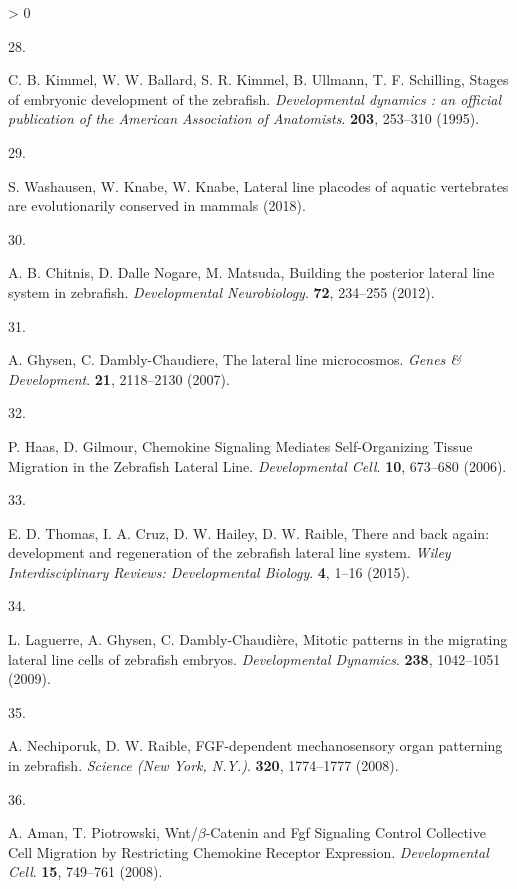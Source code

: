 \documentclass[10pt, b5paper, singlespacinge, twoside]{reedthesis} %
\newlength{\cslhangindent}
\newlength{\csllabelwidth}
\newenvironment{CSLReferences}[3] %
  {%
    \setlength{\parindent}{0pt}
    \ifodd #1 \everypar{\setlength{\hangindent}{\cslhangindent}}\ignorespaces\fi
    \ifnum #2 > 0
    \setlength{\parskip}{#2\baselineskip}
    \fi
  }%
  {}
\newcommand{\CSLLeftMargin}[1]{\parbox[t]{\maxof{\widthof{#1}}{\csllabelwidth}}{#1}}
\newcommand{\CSLRightInline}[1]{\parbox[t]{\linewidth}{#1}}
\theoremstyle{definition}
\theoremstyle{definition}
\theoremstyle{definition}
\theoremstyle{remark}
\begin{document}
\begin{CSLReferences}{0}{0}
\leavevmode\hypertarget{ref-Kimmel1995a}{}%
\CSLLeftMargin{28. }
\CSLRightInline{C. B. Kimmel, W. W. Ballard, S. R. Kimmel, B. Ullmann, T. F. Schilling, {Stages of embryonic development of the zebrafish.} \emph{Developmental dynamics : an official publication of the American Association of Anatomists}. \textbf{203}, 253--310 (1995).}

\leavevmode\hypertarget{ref-Washausen2018}{}%
\CSLLeftMargin{29. }
\CSLRightInline{S. Washausen, W. Knabe, W. Knabe, {Lateral line placodes of aquatic vertebrates are evolutionarily conserved in mammals} (2018).}

\leavevmode\hypertarget{ref-Chitnis2012a}{}%
\CSLLeftMargin{30. }
\CSLRightInline{A. B. Chitnis, D. Dalle Nogare, M. Matsuda, {Building the posterior lateral line system in zebrafish}. \emph{Developmental Neurobiology}. \textbf{72}, 234--255 (2012).}

\leavevmode\hypertarget{ref-Ghysen2007a}{}%
\CSLLeftMargin{31. }
\CSLRightInline{A. Ghysen, C. Dambly-Chaudiere, {The lateral line microcosmos}. \emph{Genes {\&} Development}. \textbf{21}, 2118--2130 (2007).}

\leavevmode\hypertarget{ref-Haas2006c}{}%
\CSLLeftMargin{32. }
\CSLRightInline{P. Haas, D. Gilmour, {Chemokine Signaling Mediates Self-Organizing Tissue Migration in the Zebrafish Lateral Line}. \emph{Developmental Cell}. \textbf{10}, 673--680 (2006).}

\leavevmode\hypertarget{ref-Harding2014a}{}%
\CSLLeftMargin{33. }
\CSLRightInline{E. D. Thomas, I. A. Cruz, D. W. Hailey, D. W. Raible, {There and back again: development and regeneration of the zebrafish lateral line system}. \emph{Wiley Interdisciplinary Reviews: Developmental Biology}. \textbf{4}, 1--16 (2015).}

\leavevmode\hypertarget{ref-Laguerre2009a}{}%
\CSLLeftMargin{34. }
\CSLRightInline{L. Laguerre, A. Ghysen, C. Dambly-Chaudière, {Mitotic patterns in the migrating lateral line cells of zebrafish embryos}. \emph{Developmental Dynamics}. \textbf{238}, 1042--1051 (2009).}

\leavevmode\hypertarget{ref-Nechiporuk2008}{}%
\CSLLeftMargin{35. }
\CSLRightInline{A. Nechiporuk, D. W. Raible, {FGF-dependent mechanosensory organ patterning in zebrafish.} \emph{Science (New York, N.Y.)}. \textbf{320}, 1774--1777 (2008).}

\leavevmode\hypertarget{ref-Aman2008}{}%
\CSLLeftMargin{36. }
\CSLRightInline{A. Aman, T. Piotrowski, {Wnt/\(\beta\)-Catenin and Fgf Signaling Control Collective Cell Migration by Restricting Chemokine Receptor Expression}. \emph{Developmental Cell}. \textbf{15}, 749--761 (2008).}


\end{CSLReferences}
\end{document}
